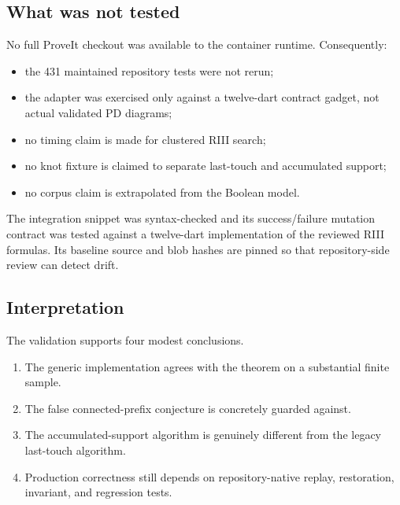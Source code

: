 \subsection{What was not tested}

No full ProveIt checkout was available to the container runtime.  Consequently:
\begin{itemize}
\item the 431 maintained repository tests were not rerun;
\item the adapter was exercised only against a twelve-dart contract gadget,
      not actual validated PD diagrams;
\item no timing claim is made for clustered RIII search;
\item no knot fixture is claimed to separate last-touch and accumulated support;
\item no corpus claim is extrapolated from the Boolean model.
\end{itemize}

The integration snippet was syntax-checked and its success/failure mutation
contract was tested against a twelve-dart implementation of the reviewed RIII
formulas.  Its baseline source and blob hashes
are pinned so that repository-side review can detect drift.

\subsection{Interpretation}

The validation supports four modest conclusions.
\begin{enumerate}
\item The generic implementation agrees with the theorem on a substantial
      finite sample.
\item The false connected-prefix conjecture is concretely guarded against.
\item The accumulated-support algorithm is genuinely different from the legacy
      last-touch algorithm.
\item Production correctness still depends on repository-native replay,
      restoration, invariant, and regression tests.
\end{enumerate}
